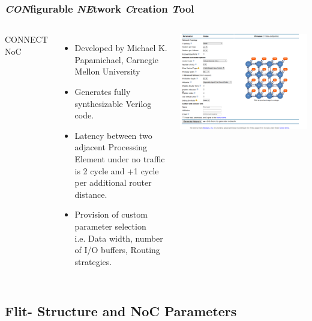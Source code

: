 \begin{frame}
  \frametitle{\emph{CON}figurable \emph{NE}twork \emph{C}reation \emph{T}ool \footnotemark}   %
  \begin{columns}[c]
  \column{3in}  %
  CONNECT NoC
  \begin{itemize}
  \item Developed by Michael K. Papamichael, Carnegie Mellon University 
  \item Generates fully synthesizable
  Verilog code.
  \item Latency between two adjacent Processing Element under no traffic
	is 2 cycle and +1 cycle per additional router distance.
  \item Provision of custom parameter selection\\
  i.e. Data width, number of I/O buffers, Routing strategies.\\
  \normalsize
  
  \end{itemize} 
  \column{3in}
  
  \includegraphics[scale=0.2]{./diagram/connect_noc_web}

  \end{columns}
\end{frame}




\subsection{Flit- Structure and NoC Parameters}


